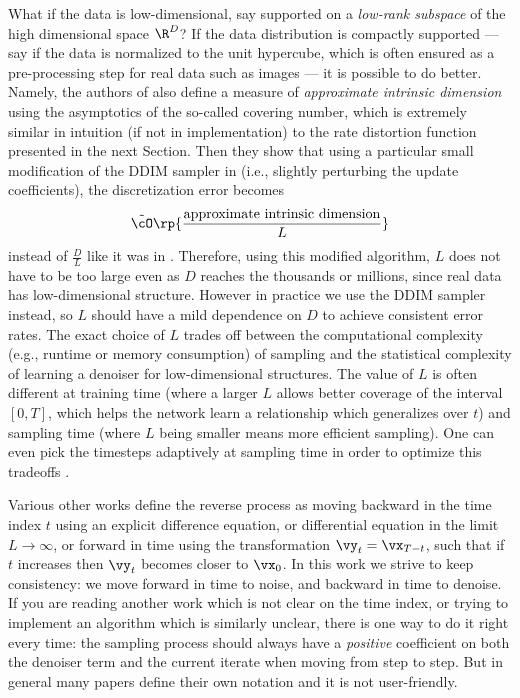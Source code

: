 \documentclass[../../book-main.tex]{subfiles}
\begin{document}
\begin{remark}
	What if the data is low-dimensional, say supported on a \textit{low-rank subspace} of the high dimensional space \(\R^{D}\)? If the data distribution is compactly supported --- say if the data is normalized to the unit hypercube, which is often ensured as a pre-processing step for real data such as images --- it is possible to do better. Namely, the authors of \cite{li2024d} also define a measure of \textit{approximate intrinsic dimension} using the asymptotics of the so-called covering number, which is extremely similar in intuition (if not in implementation) to the rate distortion function presented in the next Section. Then they show that using a particular small modification of the DDIM sampler in  (i.e., slightly perturbing the update coefficients), the discretization error becomes
	\begin{equation}
		\tilde{\cO}\rp{\frac{\text{approximate intrinsic dimension}}{L}}
	\end{equation}
	instead of \(\frac{D}{L}\) like it was in . Therefore, using this modified algorithm, \(L\) does not have to be too large even as \(D\) reaches the thousands or millions, since real data has low-dimensional structure. However in practice we use the DDIM sampler instead, so \(L\) should have a mild dependence on \(D\) to achieve consistent error rates. The exact choice of \(L\) trades off between the computational complexity (e.g., runtime or memory consumption) of sampling and the statistical complexity of learning a denoiser for low-dimensional structures. The value of \(L\) is often different at training time (where a larger \(L\) allows better coverage of the interval \([0, T]\), which helps the network learn a relationship which generalizes over \(t\)) and sampling time (where \(L\) being smaller means more efficient sampling). One can even pick the timesteps adaptively at sampling time in order to optimize this tradeoffs \cite{bao2022analytic}.
\end{remark}

\begin{remark}
	Various other works define the reverse process as moving backward in the time index \(t\) using an explicit difference equation, or differential equation in the limit \(L \to \infty\), or forward in time using the transformation \(\vy_{t} = \vx_{T - t}\), such that if \(t\) increases then \(\vy_{t}\) becomes closer to \(\vx_{0}\). In this work we strive to keep consistency: we move forward in time to noise, and backward in time to denoise. If you are reading another work which is not clear on the time index, or trying to implement an algorithm which is similarly unclear, there is one way to do it right every time: the sampling process should always have a \textit{positive} coefficient on both the denoiser term and the current iterate when moving from step to step. But in general many papers define their own notation and it is not user-friendly.
\end{remark}
\end{document}
